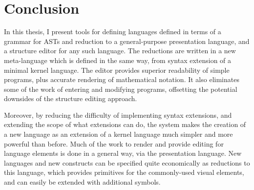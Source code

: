 \chapter{Conclusion}

In this thesis, I present tools for defining languages defined in terms of a grammar for ASTs and reduction to a general-purpose presentation language, and a structure editor for any such language. The reductions are written in a new meta-language which is defined in the same way, from syntax extension of a minimal kernel language. The editor provides superior readability of simple programs, plus accurate rendering of mathematical notation. It also eliminates some of the work of entering and modifying programs, offsetting the potential downsides of the structure editing approach.

Moreover, by reducing the difficulty of implementing syntax extensions, and extending the scope of what extensions can do, the system makes the creation of a new language as an extension of a kernel language much simpler and more powerful than before. Much of the work to render and provide editing for language elements is done in a general way, via the presentation language. New languages and new constructs can be specified quite economically as reductions to this language, which provides primitives for the commonly-used visual elements, and can easily be extended with additional symbols.
